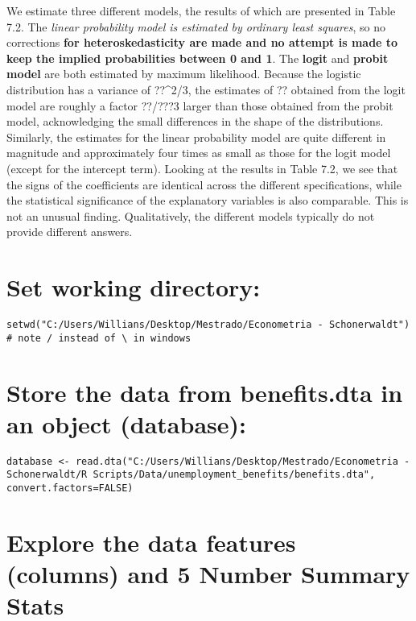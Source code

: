 \documentclass[]{article}
\begin{document}
We estimate three different models, the results of which are presented
in Table 7.2. The \emph{linear probability model is estimated by
ordinary least squares}, so no corrections \textbf{for
heteroskedasticity are made and no attempt is made to keep the implied
probabilities between 0 and 1}. The \textbf{logit} and \textbf{probit
model} are both estimated by maximum likelihood. Because the logistic
distribution has a variance of ??\^{}2/3, the estimates of ?? obtained
from the logit model are roughly a factor ??/???3 larger than those
obtained from the probit model, acknowledging the small differences in
the shape of the distributions. Similarly, the estimates for the linear
probability model are quite different in magnitude and approximately
four times as small as those for the logit model (except for the
intercept term). Looking at the results in Table 7.2, we see that the
signs of the coefficients are identical across the different
specifications, while the statistical significance of the explanatory
variables is also comparable. This is not an unusual finding.
Qualitatively, the different models typically do not provide different
answers.

\section{Set working directory:}\label{set-working-directory}

\begin{verbatim}
setwd("C:/Users/Willians/Desktop/Mestrado/Econometria - Schonerwaldt")  # note / instead of \ in windows 
\end{verbatim}

\section{Store the data from benefits.dta in an object
(database):}\label{store-the-data-from-benefits.dta-in-an-object-database}

\begin{verbatim}
database <- read.dta("C:/Users/Willians/Desktop/Mestrado/Econometria - Schonerwaldt/R Scripts/Data/unemployment_benefits/benefits.dta",  convert.factors=FALSE)
\end{verbatim}

\section{Explore the data features (columns) and 5 Number Summary
Stats}\label{explore-the-data-features-columns-and-5-number-summary-stats}
\end{document}
